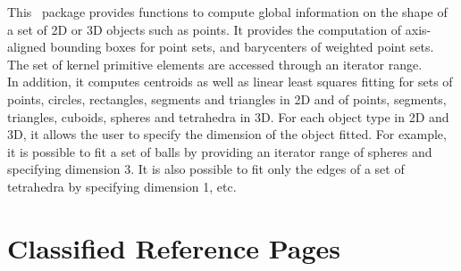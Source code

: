 


This \cgal\ package provides functions to compute global information on the shape of a set of 2D or 3D objects such as points. It provides the computation of axis-aligned bounding boxes for point sets, and barycenters of weighted point sets. The set of kernel primitive elements are accessed through an iterator range.\\

In addition, it computes centroids as well as linear least squares fitting for sets of points, circles, rectangles, segments and triangles in 2D and of points, segments, triangles, cuboids, spheres and tetrahedra in 3D. For each object type in 2D and 3D, it allows the user to specify the dimension of the object fitted. For example, it is possible to fit a set of balls by providing an iterator range of spheres and specifying dimension 3. It is also possible to fit only the edges of a set of tetrahedra by specifying dimension 1, etc.

\section{Classified Reference Pages}


\\
\\
\\
\\
\\


